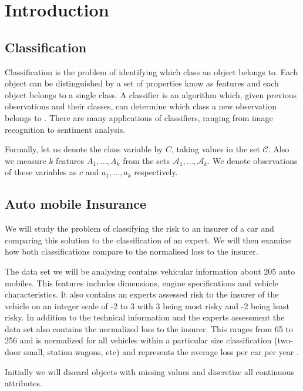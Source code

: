 \chapter{Introduction}

\section{Classification}

Classification is the problem of identifying which class an object belongs to. Each object can be distinguished by a set of properties know as features and each object belongs to a single class. A classifier is an algorithm which, given previous observations and their classes, can determine which class a new observation belongs to \cite{Theodoridis03}. There are many applications of classifiers, ranging from image recognition to sentiment analysis.

Formally, let us denote the class variable by $C$, taking values in the set $\mathcal{C}$. Also we measure $k$ features $A_1,\dots,A_k$ from the sets $\mathcal{A}_1,\dots,\mathcal{A}_k$. We denote observations of these variables as $c$ and $a_1,\dots,a_k$ respectively.

\section{Auto mobile Insurance}

We will study the problem of classifying the risk to an insurer of a car and comparing this solution to the classification of an expert. We will then examine how both classifications compare to the normalised loss to the insurer.

The data set we will be analysing contains vehicular information about 205 auto mobiles. This features includes dimensions, engine specifications and vehicle characteristics. It also contains an experts assessed risk to the insurer of the vehicle on an integer scale of -2 to 3 with 3 being most risky and -2 being least risky. In addition to the technical information and the experts assessment the data set also contains the normalized loss to the insurer. This ranges from 65 to 256 and is normalized for all vehicles within a particular size classification (two-door small, station wagons, etc) and represents the average loss per car per year \cite{Automobile}.

Initially we will discard objects with missing values and discretize all continuous attributes.



	
